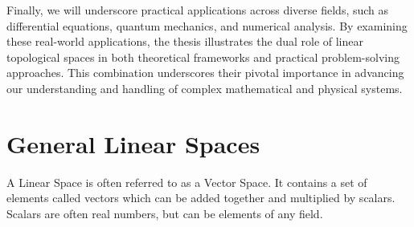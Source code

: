 \documentclass[12pt, reqno]{amsart}
\theoremstyle{definition}
\numberwithin{equation}{section}
\begin{document}
Finally, we will underscore practical applications across diverse fields, such as differential equations, quantum mechanics, and numerical analysis. By examining these real-world applications, the thesis illustrates the dual role of linear topological spaces in both theoretical frameworks and practical problem-solving approaches. This combination underscores their pivotal importance in advancing our understanding and handling of complex mathematical and physical systems.
\vfill
\pagebreak

\section{General Linear Spaces}
A Linear Space is often referred to as a Vector Space. It contains a set of elements called vectors which can be added together and multiplied by scalars. Scalars are often real numbers, but can be elements of any field.
\end{document}
